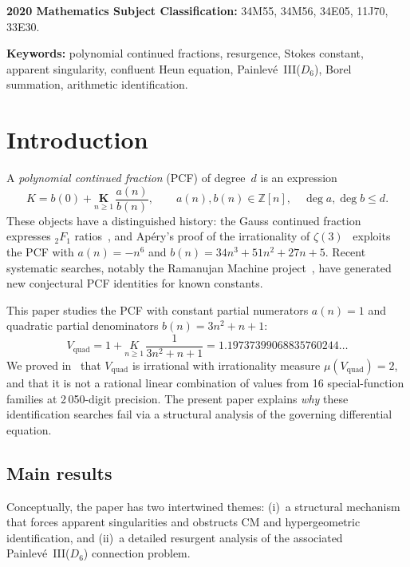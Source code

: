 \documentclass[11pt,a4paper]{article}
\theoremstyle{definition}
\theoremstyle{remark}
\newcommand{\Vq}{V_{\mathrm{quad}}}
\newcommand{\Z}{\mathbb{Z}}
\begin{document}
\noindent
\textbf{2020 Mathematics Subject Classification:}
34M55, 34M56, 34E05, 11J70, 33E30.

\noindent
\textbf{Keywords:}
polynomial continued fractions,
resurgence, Stokes constant,
apparent singularity, confluent Heun equation,
Painlev\'e~III($D_6$),
Borel summation,
arithmetic identification.


\section{Introduction}\label{sec:intro}

A \emph{polynomial continued fraction} (PCF)
of degree~$d$ is an expression
\[
  K = b(0) + \underset{n \ge 1}{\mathbf{K}}\,
  \frac{a(n)}{b(n)},
  \qquad a(n), b(n) \in \Z[n],
  \quad \deg a, \deg b \leq d.
\]
These objects have a distinguished history: the
Gauss continued fraction expresses ${}_2F_1$
ratios~\cite{lorentzen2008}, and Ap\'ery's
proof of the irrationality of
$\zeta(3)$~\cite{apery1979} exploits the PCF
with $a(n) = -n^6$ and
$b(n) = 34n^3 + 51n^2 + 27n + 5$.
Recent systematic searches, notably the
Ramanujan Machine project~\cite{raayoni2021},
have generated new conjectural PCF identities
for known constants.

This paper studies the PCF with constant
partial numerators $a(n)=1$ and quadratic
partial denominators $b(n)=3n^2+n+1$:
\begin{equation}\label{eq:vquad-def}
  \Vq = 1 + \underset{n \ge 1}{K}\,
  \frac{1}{3n^2+n+1}
  = 1.19737399068835760244\ldots
\end{equation}
We proved in~\cite{vquad-exclusion} that $\Vq$
is irrational with irrationality measure
$\mu(\Vq)=2$, and that it is not a rational
linear combination of values from 16
special-function families at 2\,050-digit
precision. The present paper explains
\emph{why} these identification searches fail
via a structural analysis of the governing
differential equation.

\subsection{Main results}

Conceptually, the paper has two intertwined
themes: (i)~a structural mechanism that forces
apparent singularities and obstructs CM and
hypergeometric identification, and (ii)~a
detailed resurgent analysis of the associated
Painlev\'e~III($D_6$) connection problem.
\end{document}
